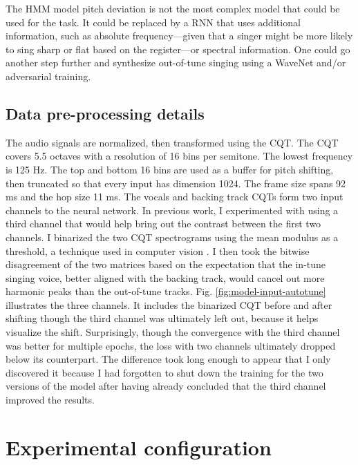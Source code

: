 The HMM model pitch deviation is not the most complex model that could be used for the task. It could be replaced by a RNN that uses additional information, such as absolute frequency---given that a singer might be more likely to sing sharp or flat based on the register---or spectral information. One could go another step further and synthesize out-of-tune singing using a WaveNet and/or adversarial training.

\subsection{Data pre-processing details}
\label{sec:data-format-autotune}
The audio signals are normalized, then transformed using the CQT. The CQT covers 5.5 octaves with a resolution of 16 bins per semitone. The lowest frequency is 125 Hz. The top and bottom 16 bins are used as a buffer for pitch shifting, then truncated so that every input has dimension 1024. The frame size spans 92 ms and the hop size 11 ms. The vocals and backing track CQTs form two input channels to the neural network. In previous work, I experimented with using a third channel that would help bring out the contrast between the first two channels. I binarized the two CQT spectrograms using the mean modulus as a threshold, a technique used in computer vision \cite{sezgin2004survey}. I then took the bitwise disagreement of the two matrices based on the expectation that the in-tune singing voice, better aligned with the backing track, would cancel out more harmonic peaks than the out-of-tune tracks. Fig. \ref{fig:model-input-autotune} illustrates the three channels. It includes the binarized CQT before and after shifting though the third channel was ultimately left out, because it helps visualize the shift. Surprisingly, though the convergence with the third channel was better for multiple epochs, the loss with two channels ultimately dropped below its counterpart. The difference took long enough to appear that I only discovered it because I had forgotten to shut down the training for the two versions of the model after having already concluded that the third channel improved the results. 

\section{Experimental configuration}
\label{sec:experiments-autotune}
